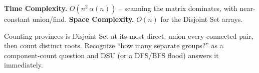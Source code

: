 \begin{complexitybox}
\textbf{Time Complexity.} $O(n^2\,\alpha(n))$ -- scanning the matrix
dominates, with near-constant union/find. \textbf{Space Complexity.}
$O(n)$ for the Disjoint Set arrays.
\end{complexitybox}

\begin{takeawaybox}
Counting provinces is Disjoint Set at its most direct: union every
connected pair, then count distinct roots. Recognize ``how many separate
groups?'' as a component-count question and DSU (or a DFS/BFS flood)
answers it immediately.
\end{takeawaybox}
